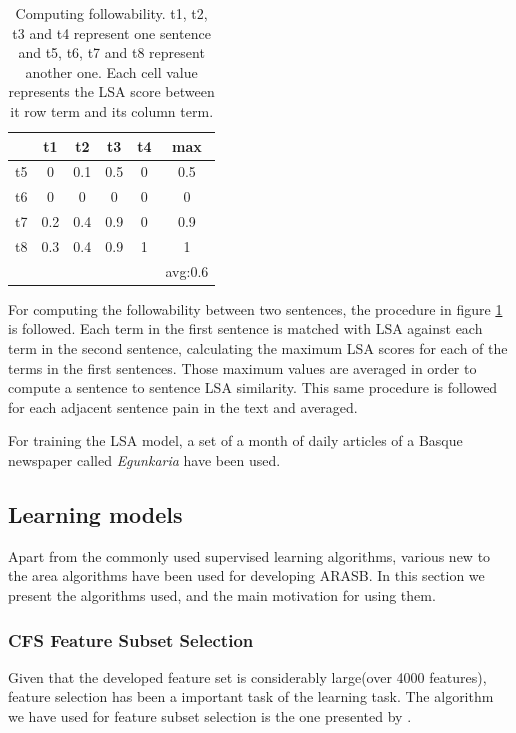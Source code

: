 \documentclass{acm_proc_article-sp}
\begin{document}
\begin{table}[h]
 \begin{center}
 \begin{tabular}{|c|c|c|c|c|c|}\hline
     & t1 & t2 & t3 & t4     & max  \\ \hline
  t5 & 0   & 0.1 & 0.5 & 0   & 0.5  \\ \hline
  t6 & 0   & 0   & 0   & 0   & 0    \\ \hline
  t7 & 0.2 & 0.4 & 0.9 & 0   & 0.9  \\ \hline
  t8 & 0.3 & 0.4 & 0.9 & 1   & 1    \\ \hline
     &     &     &     &     & avg:0.6    \\ \hline
   
 
 \end{tabular}
 \end{center}
 \caption{Computing followability. t1, t2, t3 and t4 represent one sentence and t5, t6, t7 and t8 represent another one. Each cell value represents the LSA score between it row term and its column term.}
 \label{tab:jarraitasunsemantikoa}
\end{table}

For computing the followability between two sentences, the procedure in figure \ref{tab:jarraitasunsemantikoa} is followed. Each term in the first sentence is matched with LSA against each term in the second sentence, calculating the maximum LSA scores for each of the terms in the first sentences. Those maximum values are averaged in order to compute a sentence to sentence LSA similarity. This same procedure is followed for each adjacent sentence pain in the text and averaged.


For training the LSA model, a set of a month of daily articles of a Basque newspaper called \emph{Egunkaria} have been used. 



\subsection{Learning models}
Apart from the commonly used supervised learning algorithms, various new to the area algorithms have been used for developing ARASB. In this section we present the algorithms used, and the main motivation for using them.
\subsubsection{CFS Feature Subset Selection}
Given that the developed feature set is considerably large(over 4000 features), feature selection has been a important task of the learning task. The algorithm we have used for feature subset selection is the one presented by \cite{hall1998practical}.
\end{document}
